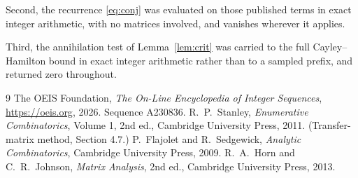 \documentclass[11pt,a4paper]{article}
\theoremstyle{plain}
\theoremstyle{definition}
\begin{document}
Second, the recurrence \eqref{eq:conj} was evaluated on those published terms in exact
integer arithmetic, with no matrices involved, and vanishes wherever it applies.

Third, the annihilation test of Lemma~\ref{lem:crit} was carried to the full
Cayley--Hamilton bound in exact integer arithmetic rather than to a sampled prefix, and
returned zero throughout.

\begin{thebibliography}{9}
 The OEIS Foundation, \emph{The On-Line Encyclopedia of Integer
Sequences}, \url{https://oeis.org}, 2026. Sequence A230836.
 R.~P.~Stanley, \emph{Enumerative Combinatorics}, Volume 1, 2nd ed.,
Cambridge University Press, 2011. (Transfer-matrix method, Section 4.7.)
 P.~Flajolet and R.~Sedgewick, \emph{Analytic Combinatorics}, Cambridge
University Press, 2009.
 R.~A.~Horn and C.~R.~Johnson, \emph{Matrix Analysis}, 2nd ed., Cambridge
University Press, 2013.
\end{thebibliography}
\end{document}
